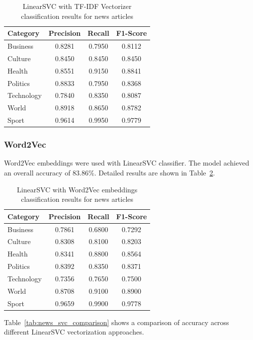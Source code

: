\documentclass[12pt,a4paper]{article}
\begin{document}
\begin{table}[h]
\centering
\begin{tabular}{lccc}
\toprule
Category & Precision & Recall & F1-Score \\
\midrule
Business & 0.8281 & 0.7950 & 0.8112 \\
Culture & 0.8450 & 0.8450 & 0.8450 \\
Health & 0.8551 & 0.9150 & 0.8841 \\
Politics & 0.8833 & 0.7950 & 0.8368 \\
Technology & 0.7840 & 0.8350 & 0.8087 \\
World & 0.8918 & 0.8650 & 0.8782 \\
Sport & 0.9614 & 0.9950 & 0.9779 \\
\bottomrule
\end{tabular}
\caption{LinearSVC with TF-IDF Vectorizer classification results for news articles}
\label{tab:news_svc_tfidf}
\end{table}

\subsubsection{Word2Vec}

Word2Vec embeddings were used with LinearSVC classifier. The model achieved an overall accuracy of 83.86\%. Detailed results are shown in Table~\ref{tab:news_svc_w2v}.

\begin{table}[h]
\centering
\begin{tabular}{lccc}
\toprule
Category & Precision & Recall & F1-Score \\
\midrule
Business & 0.7861 & 0.6800 & 0.7292 \\
Culture & 0.8308 & 0.8100 & 0.8203 \\
Health & 0.8341 & 0.8800 & 0.8564 \\
Politics & 0.8392 & 0.8350 & 0.8371 \\
Technology & 0.7356 & 0.7650 & 0.7500 \\
World & 0.8708 & 0.9100 & 0.8900 \\
Sport & 0.9659 & 0.9900 & 0.9778 \\
\bottomrule
\end{tabular}
\caption{LinearSVC with Word2Vec embeddings classification results for news articles}
\label{tab:news_svc_w2v}
\end{table}

Table~\ref{tab:news_svc_comparison} shows a comparison of accuracy across different LinearSVC vectorization approaches.
\end{document}
